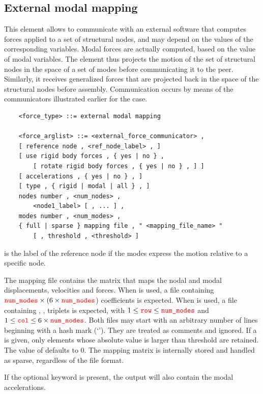 \subsection{External modal mapping}
\label{sec:EL:FORCE:EXTERNAL:MODAL_MAPPING}
This element allows to communicate with an external software that computes
forces applied to a set of structural nodes,
and may depend on the values of the corresponding variables.
Modal forces are actually computed, based on the value of modal variables.
The element thus projects the motion of the set of structural nodes
in the space of a set of modes before communicating it to the peer.
Similarly, it receives generalized forces that are projected back
in the space of the structural nodes before assembly.
Communication occurs by means of the communicators illustrated earlier
for the  case.
\begin{verbatim}
    <force_type> ::= external modal mapping

    <force_arglist> ::= <external_force_communicator> ,
    [ reference node , <ref_node_label> , ]
    [ use rigid body forces , { yes | no } ,
        [ rotate rigid body forces , { yes | no } , ] ]
    [ accelerations , { yes | no } , ]
    [ type , { rigid | modal | all } , ]
    nodes number , <num_nodes> ,
        <node1_label> [ , ... ] ,
    modes number , <num_modes> ,
    { full | sparse } mapping file , " <mapping_file_name> "
        [ , threshold , <threshold> ]
\end{verbatim}
 is the label of the reference node
if the modes express the motion relative to a specific node.

The mapping file contains the matrix that maps the nodal and modal
displacements, velocities and forces.
When  is used, a file containing
$\textcolor{red}{\texttt{num\_modes}} \times (6\times\textcolor{red}{\texttt{num\_nodes}}$) coefficients is expected.
When  is used, a file containing
, ,  triplets is expected,
with $1\le\textcolor{red}{\texttt{row}}\le\textcolor{red}{\texttt{num\_modes}}$
and $1\le\textcolor{red}{\texttt{col}}\le6\times\textcolor{red}{\texttt{num\_nodes}}$.
Both files may start with an arbitrary number of lines beginning
with a hash mark (`\kw{\#}').
They are treated as comments and ignored.
If a  is given, only elements whose absolute value
is larger than threshold are retained.
The value of  defaults to 0.
The mapping matrix is internally stored and handled as sparse,
regardless of the file format.

If the optional keyword  is present,
the output will also contain the modal accelerations.

